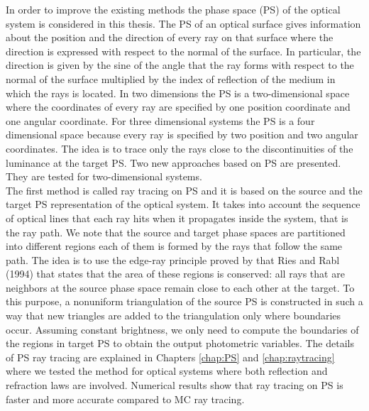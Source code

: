 In order to improve the existing methods the phase space (PS) of the optical system is considered in this thesis. The PS of an optical surface gives information about the position and the direction of every ray on that surface where the direction is expressed with respect to the normal of the surface. In particular, the direction is given by the sine of the angle that the ray forms with respect to the normal of the surface multiplied by the index of reflection of the medium in which the rays is located.
In two dimensions the PS is a two-dimensional space where the coordinates of every ray are specified by one position coordinate and one angular coordinate. 
For three dimensional systems the PS is a four dimensional space because every ray is specified by two position and two angular coordinates. The idea is to trace only the rays close to the discontinuities of the luminance at the target PS.
Two new approaches based on PS are presented. They are tested for two-dimensional systems. 
\\ \indent The first method is called ray tracing on PS and it is based on the source and the target PS representation of the optical system. It takes into account the sequence of optical lines that each ray hits when it propagates inside the system, that is the ray path. We note that the source and target phase spaces are partitioned into different regions each of them is formed by the rays that follow the same path. The idea is to use the edge-ray principle proved by that Ries and Rabl (1994) that states that the area of these regions is conserved: all rays that are neighbors at the source phase space remain close to each other at the target. To this purpose, a nonuniform triangulation of the source PS is constructed in such a way that new triangles are added to the triangulation only where boundaries occur. 
Assuming constant brightness, we only need to compute the boundaries of the regions in target PS to obtain the output photometric variables. 
The details of PS ray tracing are explained in Chapters \ref{chap:PS} and \ref{chap:raytracing} where we tested the method for optical systems where both reflection and refraction laws are involved.
 Numerical results show that ray tracing on  PS is faster and more accurate compared to MC ray tracing.
